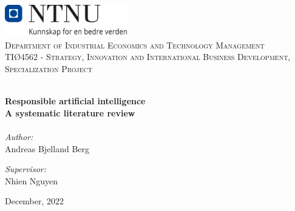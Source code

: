 
\begin{titlepage}
\vbox{ }
\vbox{ }
\begin{center}
\includegraphics[width=0.40\textwidth]{Images/NTNU_logo.png}\\[1cm]
\textsc{\LARGE Department of Industrial Economics and Technology Management}\\[1.5cm]
\textsc{\Large TIØ4562 - Strategy, Innovation and International Business Development, Specialization Project}\\[0.5cm]
\vbox{ }

\HRule \\[0.4cm]
{ \huge \bfseries Responsible artificial intelligence}\\[0.4cm]
{ \LARGE \bfseries A systematic literature review}\\[0.4cm]
\HRule \\[1.5cm]

\large
\emph{Author:}\\
Andreas Bjelland Berg

\emph{Supervisor:}\\
Nhien Nguyen
\vfill

{\large December, 2022}
\end{center}
\end{titlepage}